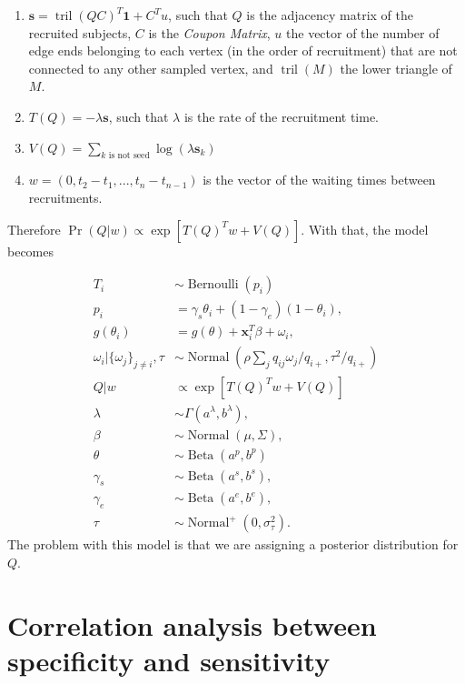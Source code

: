 \documentclass[a4paper, notitlepage, 11pt]{article}
\newcommand{\x}{\boldsymbol{x}}
\newcommand{\N}{\operatorname{Normal}}
\newcommand{\betadist}{\operatorname{Beta}}
\newcommand{\bern}{\operatorname{Bernoulli}}
\newcommand{\tril}{\operatorname{tril}}
\theoremstyle{definition}
\theoremstyle{remark}
\begin{document}
\begin{enumerate}
  \item $\boldsymbol{s} = \tril(QC)^T \boldsymbol{1} + C^Tu$, such that $Q$ is the
  adjacency matrix of the recruited subjects, $C$ is the {\em Coupon Matrix},
  $u$ the vector of the number of edge ends belonging to each vertex
  (in the order of recruitment) that are not connected to any other sampled
  vertex, and $\tril(M)$ the lower triangle of $M$. 

  \item $T(Q) = -\lambda \boldsymbol{s}$, such that $\lambda$ is the rate of
  the recruitment time. 

  \item $V(Q) = \sum_{k \text{ is not seed}} \log(\lambda \boldsymbol{s}_k)$
  
  \item $w = (0, t_2 - t_1, ..., t_n - t_{n-1})$ is the vector of the waiting times between
  recruitments.  
\end{enumerate}

Therefore $\Pr(Q|w) \propto \exp[T(Q)^Tw + V(Q)]$. With that, the model
becomes 

\begin{equation}
  \begin{aligned}
    T_i &\sim \bern(p_i) \\
    p_i &= \gamma_s\theta_i + (1-\gamma_e)(1 - \theta_i),  \\
    g(\theta_i) &= g(\theta) + \x_i^T\beta + \omega_i,  \\
    \omega_i|\{\omega_j\}_{j\neq i}, \tau &\sim \N\left(\rho\sum_j q_{ij}\omega_j/q_{i+}, \tau^2/q_{i+}\right) \\
    Q|w &\propto \exp[T(Q)^Tw + V(Q)] \\
    \lambda &\sim \Gamma(a^{\lambda}, b^{\lambda}), \\ 
    \beta &\sim \N(\mu, \Sigma), \\ 
    \theta &\sim \betadist(a^p, b^p) \\
    \gamma_s &\sim \betadist(a^s, b^s), \\
    \gamma_e &\sim \betadist(a^e, b^e), \\  
    \tau &\sim \N^+(0,\sigma^2_{\tau}).
  \end{aligned}  
\end{equation}
The problem with this model is that we are assigning a posterior distribution
for $Q$.

\section{Correlation analysis between specificity and sensitivity}
\end{document}
